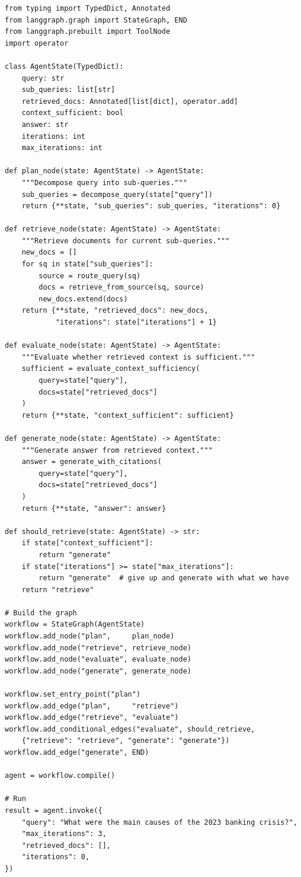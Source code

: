 \begin{lstlisting}[style=pythonstyle, caption={LangGraph-based agentic RAG}]
from typing import TypedDict, Annotated
from langgraph.graph import StateGraph, END
from langgraph.prebuilt import ToolNode
import operator

class AgentState(TypedDict):
    query: str
    sub_queries: list[str]
    retrieved_docs: Annotated[list[dict], operator.add]
    context_sufficient: bool
    answer: str
    iterations: int
    max_iterations: int

def plan_node(state: AgentState) -> AgentState:
    """Decompose query into sub-queries."""
    sub_queries = decompose_query(state["query"])
    return {**state, "sub_queries": sub_queries, "iterations": 0}

def retrieve_node(state: AgentState) -> AgentState:
    """Retrieve documents for current sub-queries."""
    new_docs = []
    for sq in state["sub_queries"]:
        source = route_query(sq)
        docs = retrieve_from_source(sq, source)
        new_docs.extend(docs)
    return {**state, "retrieved_docs": new_docs,
            "iterations": state["iterations"] + 1}

def evaluate_node(state: AgentState) -> AgentState:
    """Evaluate whether retrieved context is sufficient."""
    sufficient = evaluate_context_sufficiency(
        query=state["query"],
        docs=state["retrieved_docs"]
    )
    return {**state, "context_sufficient": sufficient}

def generate_node(state: AgentState) -> AgentState:
    """Generate answer from retrieved context."""
    answer = generate_with_citations(
        query=state["query"],
        docs=state["retrieved_docs"]
    )
    return {**state, "answer": answer}

def should_retrieve(state: AgentState) -> str:
    if state["context_sufficient"]:
        return "generate"
    if state["iterations"] >= state["max_iterations"]:
        return "generate"  # give up and generate with what we have
    return "retrieve"

# Build the graph
workflow = StateGraph(AgentState)
workflow.add_node("plan",     plan_node)
workflow.add_node("retrieve", retrieve_node)
workflow.add_node("evaluate", evaluate_node)
workflow.add_node("generate", generate_node)

workflow.set_entry_point("plan")
workflow.add_edge("plan",     "retrieve")
workflow.add_edge("retrieve", "evaluate")
workflow.add_conditional_edges("evaluate", should_retrieve,
    {"retrieve": "retrieve", "generate": "generate"})
workflow.add_edge("generate", END)

agent = workflow.compile()

# Run
result = agent.invoke({
    "query": "What were the main causes of the 2023 banking crisis?",
    "max_iterations": 3,
    "retrieved_docs": [],
    "iterations": 0,
})
\end{lstlisting}

